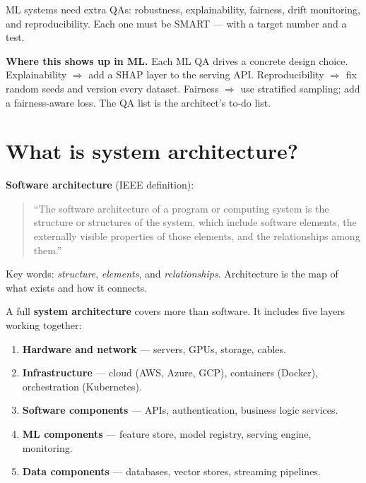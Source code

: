 \documentclass[a4paper,11pt]{article}
\newcommand{\vocab}[1]{\textbf{\color{navy}#1}}
\begin{document}
\begin{keytake}
ML systems need extra QAs: robustness, explainability, fairness, drift
monitoring, and reproducibility. Each one must be SMART — with a target
number and a test.
\end{keytake}

\noindent\textbf{Where this shows up in ML.}
Each ML QA drives a concrete design choice.
Explainability $\Rightarrow$ add a SHAP layer to the serving API.
Reproducibility $\Rightarrow$ fix random seeds and version every dataset.
Fairness $\Rightarrow$ use stratified sampling; add a fairness-aware loss.
The QA list is the architect's to-do list.

\section{What is system architecture?}

\vocab{Software architecture} (IEEE definition):
\begin{quote}
``The software architecture of a program or computing system is the
structure or structures of the system, which include software elements,
the externally visible properties of those elements, and the
relationships among them.''
\end{quote}

Key words: \emph{structure}, \emph{elements}, and \emph{relationships}.
Architecture is the map of what exists and how it connects.

A full \vocab{system architecture} covers more than software. It includes
five layers working together:

\begin{enumerate}
  \item \textbf{Hardware and network} — servers, GPUs, storage, cables.
  \item \textbf{Infrastructure} — cloud (AWS, Azure, GCP), containers
        (Docker), orchestration (Kubernetes).
  \item \textbf{Software components} — APIs, authentication, business
        logic services.
  \item \textbf{ML components} — feature store, model registry, serving
        engine, monitoring.
  \item \textbf{Data components} — databases, vector stores, streaming
        pipelines.
\end{enumerate}
\end{document}
